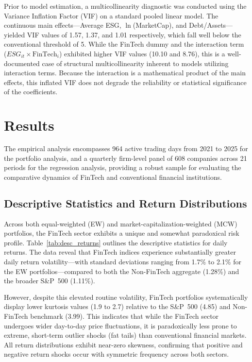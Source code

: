 \documentclass[12pt]{article}
\begin{document}
Prior to model estimation, a multicollinearity diagnostic was conducted using the Variance Inflation Factor (VIF) on a standard pooled linear model. The continuous main effects---Average ESG, $\ln$(MarketCap), and Debt/Assets---yielded VIF values of 1.57, 1.37, and 1.01 respectively, which fall well below the conventional threshold of 5. While the FinTech dummy and the interaction term ($\textit{ESG}_{it} \times \text{FinTech}_i$) exhibited higher VIF values (10.10 and 8.76), this is a well-documented case of structural multicollinearity inherent to models utilizing interaction terms. Because the interaction is a mathematical product of the main effects, this inflated VIF does not degrade the reliability or statistical significance of the coefficients.

\section{Results}\label{sec:results}
The empirical analysis encompasses 964 active trading days from 2021 to 2025 for the portfolio analysis, and a quarterly firm-level panel of 608 companies across 21 periods for the regression analysis, providing a robust sample for evaluating the comparative dynamics of FinTech and conventional financial institutions.

\subsection{Descriptive Statistics and Return Distributions}
Across both equal-weighted (EW) and market-capitalization-weighted (MCW) portfolios, the FinTech sector exhibits a unique and somewhat paradoxical risk profile. Table~\ref{tab:desc_returns} outlines the descriptive statistics for daily returns. The data reveal that FinTech indices experience substantially greater daily return volatility---with standard deviations ranging from 1.7\% to 2.1\% for the EW portfolios---compared to both the Non-FinTech aggregate (1.28\%) and the broader S\&P~500 (1.11\%).

However, despite this elevated routine volatility, FinTech portfolios systematically display lower kurtosis values (1.9 to 2.7) relative to the S\&P~500 (4.85) and Non-FinTech benchmark (3.99). This indicates that while the FinTech sector undergoes wider day-to-day price fluctuations, it is paradoxically less prone to extreme, short-term outlier shocks (fat tails) than conventional financial markets. All return distributions exhibit near-zero skewness, confirming that positive and negative return shocks occur with symmetric frequency across both sectors.
\end{document}

